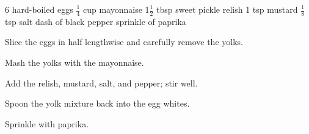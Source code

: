 \dishtype{\vegetarian}
\begin{ingreds}
    6 hard-boiled eggs
    $\frac{1}{4}$ cup mayonnaise
    1$\frac{1}{2}$ tbsp sweet pickle relish
    1 tsp mustard
    $\frac{1}{8}$ tsp salt
    dash of black pepper
    sprinkle of paprika
\end{ingreds}
\begin{method}
    Slice the eggs in half lengthwise and carefully remove the yolks.\par
    Mash the yolks with the mayonnaise.\par
    Add the relish, mustard, salt, and pepper; stir well.\par
    Spoon the yolk mixture back into the egg whites.\par
    Sprinkle with paprika.
\end{method}